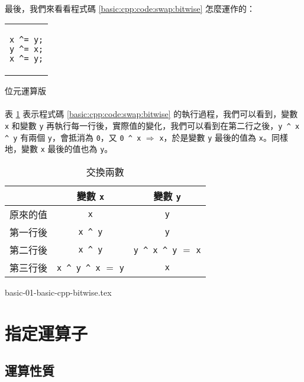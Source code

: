 \documentclass[12pt,a4paper,oneside]{report}
\begin{document}
\begin{CJK}{UTF8}{bkai}
\paragraph{}最後，我們來看看程式碼 \ref{basic:cpp:code:swap:bitwise} 怎麼運作的：

\begin{code}[h!]
\centering
\begin{tabular}{c}
\begin{lstlisting}
x ^= y;
y ^= x;
x ^= y;
\end{lstlisting}
\end{tabular}
\caption{位元運算版}
\label{basic:cpp:code:swap:bitwise}
\end{code}

\paragraph{}表 \ref{basic:cpp:table:swap:bitwise} 表示程式碼 \ref{basic:cpp:code:swap:bitwise} 的執行過程，我們可以看到，變數 \lstinline!x! 和變數 \lstinline!y! 再執行每一行後，實際值的變化，我們可以看到在第二行之後，\lstinline!y ^ x ^ y! 有兩個 \lstinline!y!，會抵消為 \lstinline!0!，又 \lstinline!0 ^ x! $\Rightarrow$ \lstinline!x!，於是變數 \lstinline!y! 最後的值為 \lstinline!x!。同樣地，變數 \lstinline!x! 最後的值也為 \lstinline!y!。

\begin{table}[h!]
\centering
\begin{tabular}{c|c|c}
 & 變數 \lstinline!x! & 變數 \lstinline!y!\\
\hline\hline
原來的值 & \lstinline!x! & \lstinline!y! \\
\hline
第一行後 & \lstinline!x ^ y! & \lstinline!y! \\
\hline
第二行後 & \lstinline!x ^ y! & \lstinline!y ^ x ^ y! $=$ \lstinline!x!\\
\hline
第三行後 & \lstinline!x ^ y ^ x! $=$ \lstinline!y! & \lstinline!x!\\
\end{tabular}
\caption{交換兩數}
\label{basic:cpp:table:swap:bitwise}
\end{table}

\label{basic:cpp:problem:bitwise}
{basic-01-basic-cpp-bitwise.tex}

\section{指定運算子}
\subsection{運算性質}


\end{CJK}
\end{document}
